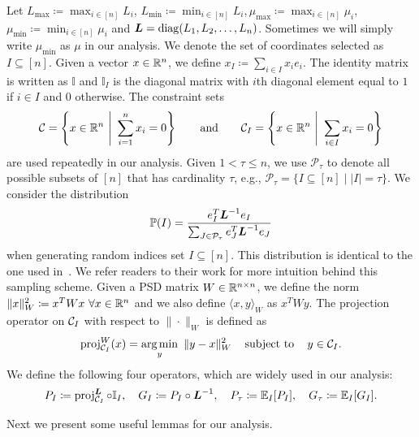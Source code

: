 Let $L_{\max} \coloneqq \max_{i \in [n]} L_i$, $L_{\min} \coloneqq \min_{i \in [n]} L_i, \mu_{\max} \coloneqq \max_{i \in [n]} \mu_i$, $\mu_{\min} \coloneqq \min_{i \in [n]} \mu_i$ and $\boldsymbol{L} = \operatorname{diag}(L_1, L_2, \ldots, L_n)$. Sometimes we will simply write $\mu_{\min}$ as $\mu$ in our analysis. 
We denote the set of coordinates selected as $I \subseteq [n]$. Given a vector $x \in \mathbb{R}^n$, we define $x_I \coloneqq \sum_{i \in I} x_i e_i $. The identity matrix is written as $\mathbb{I}$ and $\mathbb{I}_I$ is the diagonal matrix with $i$th diagonal element equal to $1$ if $i \in I$ and $0$ otherwise. The constraint sets
\[
    \mathcal{C} = \left\{x\in\mathbb{R}^n ~\Bigg|~ \sum_{i=1}^n x_i=0\right\} \quad \hbox{\quad and\quad} \quad \mathcal{C}_I=\left\{x\in\mathbb{R}^n ~\Bigg|~ \sum_{i\in I}x_i = 0\right\}
\]
are used repeatedly in our analysis. Given $1 < \tau \leq n$, we use $\mathcal{P}_\tau$ to denote all possible subsets of $[n]$ that has cardinality $\tau$, e.g., $\mathcal{P}_\tau = \{ I \subseteq [n] \mid |I| = \tau \}$. We consider the distribution
\[
    \mathbb{P}(I) = \frac{e_I^T\boldsymbol{L}^{-1}e_I}{\sum_{J \in \mathcal{P}_\tau} e_J^T\boldsymbol{L}^{-1}e_J}
\]
when generating random indices set $I \subseteq [n]$. This distribution is identical to the one used in~\citet{necoara2017random}. We refer readers to their work for more intuition behind this sampling scheme. Given a PSD matrix $W\in \mathbb{R}^{n \times n}$, we define the norm $\|x\|_W^2 \coloneqq x^T W x~\forall x \in \mathbb{R}^{n}$ and we also define $\langle x,y \rangle_{W}$ as $x^T W y$. The projection operator on $\mathcal{C}_I$ with respect to $\|\cdot\|_W$ is defined as
\[
    \operatorname{proj}_{\mathcal{C}_I}^{W}(x) = \underset{y}{\textrm{arg}\,{\min}}\enskip \|y-x\|_W^2 \enspace\enspace\mathop{\hbox{\rm subject to}}\enspace\enspace y \in \mathcal{C}_I.
\]
We define the following four operators, which are widely used in our analysis:
\[
    P_I \coloneqq \operatorname{proj}_{\mathcal{C}_I}^{\boldsymbol{L}} \circ \mathbb{I}_I, \quad  G_I \coloneqq P_I \circ \boldsymbol{L}^{-1}, \quad P_\tau \coloneqq \mathbb{E}_I [P_I], \quad G_\tau \coloneqq \mathbb{E}_I [G_I].
\]

Next we present some useful lemmas for our analysis.

